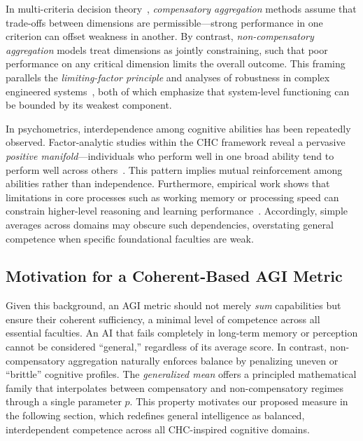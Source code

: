 \documentclass{article}
\begin{document}
In multi-criteria decision theory~\citep{keeney1993decisions}, \emph{compensatory aggregation} methods assume that trade-offs between dimensions are permissible—strong performance in one criterion can offset weakness in another.
By contrast, \emph{non-compensatory aggregation} models treat dimensions as jointly constraining, such that poor performance on any critical dimension limits the overall outcome.
This framing parallels the \emph{limiting-factor principle} and analyses of robustness in complex engineered systems~\citep{kitano2004biological}, both of which emphasize that system-level functioning can be bounded by its weakest component.




In psychometrics, interdependence among cognitive abilities has been repeatedly observed.
Factor-analytic studies within the CHC framework reveal a pervasive \emph{positive manifold}—individuals who perform well in one broad ability tend to perform well across others~\citep{carroll1993human,mcgrew2009chc,mcgrew2023carroll}.
This pattern implies mutual reinforcement among abilities rather than independence.
Furthermore, empirical work shows that limitations in core processes such as working memory or processing speed can constrain higher-level reasoning and learning performance~\citep{fry2000relationships}.
Accordingly, simple averages across domains may obscure such dependencies, overstating general competence when specific foundational faculties are weak.


\subsection{Motivation for a Coherent-Based AGI Metric}

Given this background, an AGI metric should not merely \emph{sum} capabilities but ensure their coherent sufficiency, a minimal level of competence across all essential faculties.
An AI that fails completely in long-term memory or perception cannot be considered ``general,'' regardless of its average score.
In contrast, non-compensatory aggregation naturally enforces balance by penalizing uneven or ``brittle'' cognitive profiles.
The \emph{generalized mean} offers a principled mathematical family that interpolates between compensatory and non-compensatory regimes through a single parameter $p$.
This property motivates our proposed measure in the following section, which redefines general intelligence as balanced, interdependent competence across all CHC-inspired cognitive domains.
\end{document}
